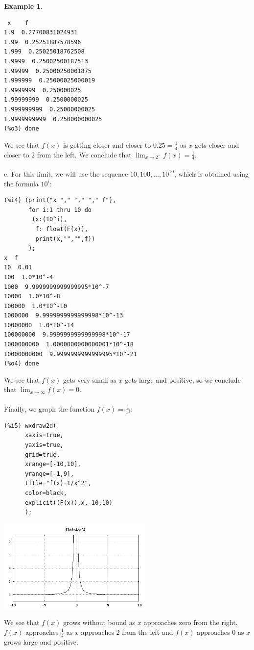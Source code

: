 \documentclass[10.5pt,twoside]{report}
\theoremstyle{definition}
\newtheorem{exmp}{Example}[section]
\begin{document}
\begin{exmp}
\begin{verbatim}
 x    f
1.9  0.27700831024931
1.99  0.25251887578596
1.999  0.25025018762508
1.9999  0.25002500187513
1.99999  0.25000250001875
1.999999  0.25000025000019
1.9999999  0.250000025
1.99999999  0.2500000025
1.999999999  0.25000000025
1.9999999999  0.250000000025
(%o3) done
\end{verbatim}

We see that $f(x)$ is getting closer and closer to $0.25=\frac{1}{4}$ as $x$ gets closer and closer to $2$ from the left.  We conclude that $\lim_{x \to 2^{-}}f(x)=\frac{1}{4}$.\\
${}$\\


c.  For this limit, we will use the sequence $10,100,\dots,10^{10}$, which is obtained using the formula $10^i$:

\begin{verbatim}
(%i4) (print("x "," "," "," f"),
       for i:1 thru 10 do
        (x:(10^i),
         f: float(F(x)),
         print(x,"","",f))
       );
x  f
10  0.01
100  1.0*10^-4
1000  9.9999999999999995*10^-7
10000  1.0*10^-8
100000  1.0*10^-10
1000000  9.9999999999999998*10^-13
10000000  1.0*10^-14
100000000  9.9999999999999998*10^-17
1000000000  1.0000000000000001*10^-18
10000000000  9.9999999999999995*10^-21
(%o4) done
\end{verbatim}

We see that $f(x)$ gets very small as $x$ gets large and positive, so we conclude that $\lim_{x \to \infty}f(x)=0$.\\
${}$\\
Finally, we graph the function $f(x)=\frac{1}{x^2}$:

\begin{verbatim}
(%i5) wxdraw2d(
      xaxis=true,
      yaxis=true,
      grid=true,
      xrange=[-10,10],
      yrange=[-1,9],
      title="f(x)=1/x^2",
      color=black,
      explicit((F(x)),x,-10,10)
      );
\end{verbatim}

\includegraphics[width=3in]{example_3_1_1}

We see that $f(x)$ grows without bound as $x$ approaches zero from the right, $f(x)$ approaches $\frac{1}{4}$ as $x$ approaches 2 from the left and $f(x)$ approaches 0 as $x$ grows large and positive.

\end{exmp}
\end{document}
